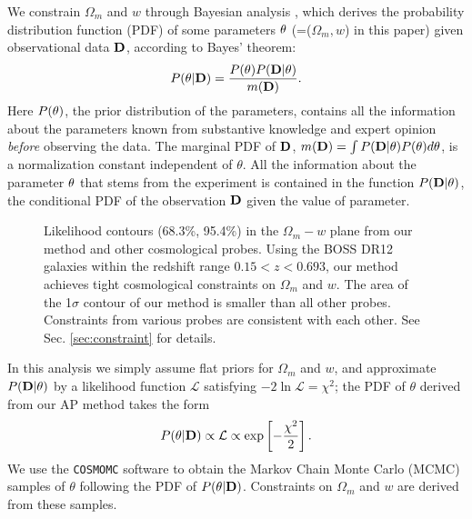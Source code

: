 \documentclass[iop]{emulateapj}
\begin{document}
We constrain $\Omega_m$ and $w$ through Bayesian analysis \citep{Bayesian},
which derives the probability distribution function (PDF) of some parameters $\bf \theta$ (=($\Omega_m,w$) in this paper)
given observational data $\bf D$, 
according to Bayes' theorem:
\begin{equation}
 P({\bf \theta}|{\bf D}) = \frac{P({\bf \theta})P({\bf D}|{\bf \theta})}{m({\bf D})}.
\end{equation}
Here $P(\bf \theta)$, the prior distribution of the parameters,
contains all the information about the parameters known from substantive knowledge 
and expert opinion {\it before} observing the data.
The marginal PDF of $\bf D$, 
$m({\bf D})=\int P({\bf D|\theta})P({\bf \theta})d{\bf \theta}$, 
is a normalization constant independent of $\theta$.
All the information about the parameter $\bf \theta$ that stems from the experiment
is contained in the function $P({\bf D}|{\bf \theta})$, 
the conditional PDF of the observation $\bf D$ given the value of parameter.

\begin{figure*}
   \centering{
   }
   \caption{\label{fig_contours}
   Likelihood contours (68.3\%, 95.4\%) in the $\Omega_m-w$ plane from our method and other cosmological probes.
   Using the BOSS DR12 galaxies within the redshift range $0.15< z< 0.693$, our method achieves tight cosmological constraints on $\Omega_m$ and $w$.
   The area of the 1$\sigma$ contour of our method is smaller than all other probes.
   Constraints from various probes are consistent with each other.
   See Sec. \ref{sec:constraint} for details.
   }
\end{figure*}

In this analysis we simply assume flat priors for $\Omega_m$ and $w$,
and approximate $P({\bf D}|{\bf \theta})$ by a likelihood function $\mathcal{L}$
satisfying  $-2 \ln \mathcal{L}=\chi^2$;
the PDF of $\theta$ derived from our AP method takes the form
\begin{equation}
 P({\bf \theta}|{\bf D}) \propto \mathcal{L} \propto \exp\left[-\frac{\chi^2}{2}\right].
\end{equation}
We use the {\texttt {COSMOMC}} software \citep{LB2002}
to obtain the Markov Chain Monte Carlo (MCMC) samples of $\theta$ following the PDF of $P({\bf \theta}|{\bf D})$.
Constraints on $\Omega_m$ and $w$ are derived from these samples.
\end{document}
